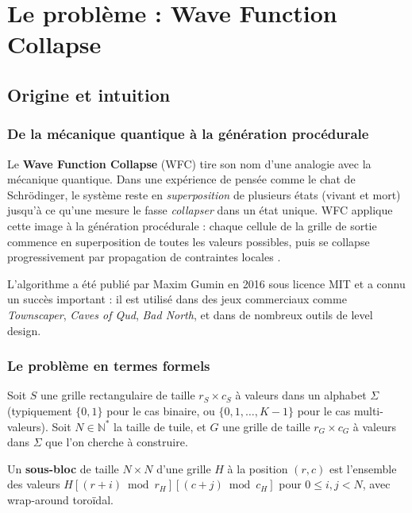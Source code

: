 \chapter{Le problème : Wave Function Collapse}
\label{chap:probleme_wfc}

\section{Origine et intuition}

\subsection{De la mécanique quantique à la génération procédurale}

Le \textbf{Wave Function Collapse} (WFC) tire son nom d'une analogie avec la mécanique quantique. Dans une expérience de pensée comme le chat de Schrödinger, le système reste en \textit{superposition} de plusieurs états (vivant et mort) jusqu'à ce qu'une mesure le fasse \textit{collapser} dans un état unique. WFC applique cette image à la génération procédurale : chaque cellule de la grille de sortie commence en superposition de toutes les valeurs possibles, puis se collapse progressivement par propagation de contraintes locales \cite{heaton2018wfc}.

L'algorithme a été publié par Maxim Gumin en 2016 \cite{gumin2016wfc} sous licence MIT et a connu un succès important : il est utilisé dans des jeux commerciaux comme \textit{Townscaper}, \textit{Caves of Qud}, \textit{Bad North}, et dans de nombreux outils de level design.

\subsection{Le problème en termes formels}

Soit $S$ une grille rectangulaire de taille $r_S \times c_S$ à valeurs dans un alphabet $\Sigma$ (typiquement $\{0, 1\}$ pour le cas binaire, ou $\{0, 1, \ldots, K-1\}$ pour le cas multi-valeurs). Soit $N \in \mathbb{N}^*$ la taille de tuile, et $G$ une grille de taille $r_G \times c_G$ à valeurs dans $\Sigma$ que l'on cherche à construire.

\begin{definition}
Un \textbf{sous-bloc} de taille $N \times N$ d'une grille $H$ à la position $(r, c)$ est l'ensemble des valeurs $H[(r+i) \bmod r_H][(c+j) \bmod c_H]$ pour $0 \leq i, j < N$, avec wrap-around toroïdal.
\end{definition}

